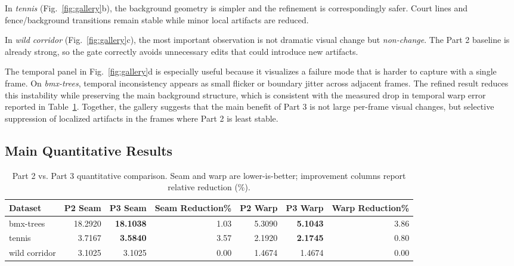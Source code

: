 \documentclass[10pt,twocolumn,letterpaper]{article}
\begin{document}
In \textit{tennis} (Fig.~\ref{fig:gallery}b), the background geometry is simpler and the refinement is correspondingly safer. Court lines and fence/background transitions remain stable while minor local artifacts are reduced.

In \textit{wild corridor} (Fig.~\ref{fig:gallery}c), the most important observation is not dramatic visual change but \emph{non-change}. The Part 2 baseline is already strong, so the gate correctly avoids unnecessary edits that could introduce new artifacts.

The temporal panel in Fig.~\ref{fig:gallery}d is especially useful because it visualizes a failure mode that is harder to capture with a single frame. On \textit{bmx-trees}, temporal inconsistency appears as small flicker or boundary jitter across adjacent frames. The refined result reduces this instability while preserving the main background structure, which is consistent with the measured drop in temporal warp error reported in Table~\ref{tab:main}. Together, the gallery suggests that the main benefit of Part 3 is not large per-frame visual changes, but selective suppression of localized artifacts in the frames where Part 2 is least stable.

\subsection{Main Quantitative Results}
\begin{table}[t]
\centering
\scriptsize
\caption{Part 2 vs. Part 3 quantitative comparison. Seam and warp are lower-is-better; improvement columns report relative reduction (\%).}
\label{tab:main}
\begin{tabular}{lrrrrrr}
\toprule
Dataset & P2 Seam & P3 Seam & Seam Reduction\% & P2 Warp & P3 Warp & Warp Reduction\% \\
\midrule
bmx-trees & 18.2920 & \textbf{18.1038} & 1.03 & 5.3090 & \textbf{5.1043} & 3.86 \\
tennis & 3.7167 & \textbf{3.5840} & 3.57 & 2.1920 & \textbf{2.1745} & 0.80 \\
wild corridor & 3.1025 & 3.1025 & 0.00 & 1.4674 & 1.4674 & 0.00 \\
\bottomrule
\end{tabular}
\end{table}
\end{document}
